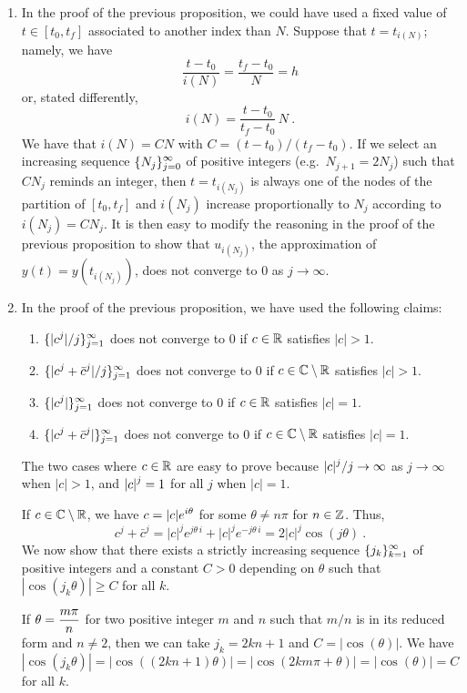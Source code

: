 \begin{rmkList}
\begin{enumerate}
\item In the proof of the previous proposition, we could have used a
fixed value of $t \in [t_0,t_f]$ associated to another index than $N$.
Suppose that $t = t_{i(N)}$; namely, we have
\[
  \frac{t-t_0}{i(N)} = \frac{t_f-t_0}{N} = h
\]
or, stated differently,
\[
  i(N) = \frac{t-t_0}{t_f-t_0}\, N \ .
\]
We have that $i(N) = C N$ with $C = (t-t_0)/(t_f-t_0)$.
If we select an increasing sequence
$\displaystyle \{N_j\}_{j=0}^\infty$ of positive
integers (e.g.\ $N_{j+1} = 2 N_j$) such that $C N_j$ reminds an
integer, then $t = t_{i(N_j)}$ is always one of the nodes of the
partition of $[t_0,t_f]$ and $i(N_j)$ increase proportionally to $N_j$
according to $i(N_j) = C N_j$.  It is then easy to modify the
reasoning in the proof of the previous proposition to show that
$u_{i(N_j)}$, the approximation of $y(t) = y(t_{i(N_j)})$, does not
converge to $0$ as $j \to \infty$.
\item In the proof of the previous proposition, we have used the
following claims:
\begin{enumerate}  
\item $\displaystyle \{|c^j|/j\}_{j=1}^\infty$ does not converge to $0$ if
$c\in \mathbb{R}$ satisfies $|c|>1$.
\item $\displaystyle \{|c^j+\bar{c}^j|/j\}_{j=1}^\infty$ does not
converge to $0$ if $c\in \mathbb{C} \setminus \mathbb{R}$ satisfies $|c|>1$.
\item $\displaystyle \{|c^j|\}_{j=1}^\infty$ does not converge to $0$
if $c\in \mathbb{R}$ satisfies $|c| = 1$.
\item $\displaystyle \{|c^j+\bar{c}^j|\}_{j=1}^\infty$ does not
converge to $0$ if $c\in \mathbb{C} \setminus \mathbb{R}$ satisfies $|c|=1$.
\end{enumerate}

The two cases where $c \in \mathbb{R}$ are easy to prove because
$\displaystyle |c|^j/j \to \infty$ as $j \to \infty$ when $|c| >1$, and
$\displaystyle |c|^j = 1$ for all $j$ when $|c|=1$.

If $c \in \mathbb{C} \setminus \mathbb{R}$, we have
$\displaystyle c = |c| e^{i\theta}$ for some
$\theta \neq n\pi$ for $n \in \mathbb{Z}$.  Thus,
\[
 c^j+\bar{c}^j = |c|^j e^{j \theta\,i} + |c|^j e^{-j \theta\,i}
 = 2|c|^j \cos(j \theta) \ .
\]
We now show that there exists a strictly increasing sequence
$\displaystyle \{j_k\}_{k=1}^\infty$ of positive integers and a constant $C>0$
depending on $\theta$ such that $|\cos(j_k \theta)|\geq C$ for all $k$.

If $\displaystyle \theta = \frac{m \pi}{n}$ for two positive integer
$m$ and $n$ such that $m/n$ is in its reduced form and $n\neq 2$, then
we can take $j_k = 2 k n +1$ and $C = |\cos(\theta)|$.  We have
\[
  |\cos(j_k \theta)| = |\cos( (2kn+1) \theta)|
  = |\cos( 2km\pi + \theta)| = |\cos(\theta)| = C
\]
for all $k$.


\end{enumerate}
\end{rmkList}
